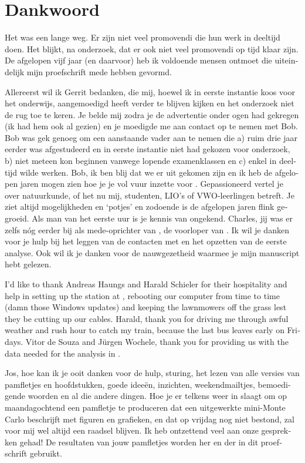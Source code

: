 \chapter{Dankwoord}

\begin{otherlanguage}{dutch}

Het was een lange weg.  Er zijn niet veel promovendi die hun werk in
deeltijd doen.  Het blijkt, na onderzoek, dat er ook niet veel promovendi
op tijd klaar zijn.  De afgelopen vijf jaar (en daarvoor) heb ik voldoende
mensen ontmoet die uiteindelijk mijn proefschrift mede hebben gevormd.

Allereerst wil ik Gerrit bedanken, die mij, hoewel ik in eerste instantie
koos voor het onderwijs, aangemoedigd heeft verder te blijven kijken en
het onderzoek niet de rug toe te keren.  Je belde mij zodra je de
advertentie onder ogen had gekregen (ik had hem ook al gezien) en je
moedigde me aan contact op te nemen met Bob.  Bob was gek genoeg om een
aanstaande vader aan te nemen die a) ruim drie jaar eerder was
afgestudeerd en in eerste instantie niet had gekozen voor onderzoek, b)
niet meteen kon beginnen vanwege lopende examenklassen en c) enkel in
deeltijd wilde werken.  Bob, ik ben blij dat we er uit gekomen zijn en ik
heb de afgelopen jaren mogen zien hoe je je vol vuur inzette voor
\hisparc.  Gepassioneerd vertel je over natuurkunde, of het nu mij,
studenten, LIO's of VWO-leerlingen betreft.  Je ziet altijd mogelijkheden
en `potjes' en zodoende is \hisparc de afgelopen jaren flink gegroeid.
Als man van het eerste uur is je kennis van \hisparc ongekend.  Charles,
jij was er zelfs nóg eerder bij als mede-oprichter van ,
de voorloper van \hisparc.  Ik wil je danken voor je hulp bij het leggen
van de contacten met \kascade en het opzetten van de eerste analyse.  Ook
wil ik je danken voor de nauwgezetheid waarmee je mijn manuscript hebt
gelezen.

I'd like to thank Andreas Haungs and Harald Schieler for their hospitality
and help in setting up the \hisparc station at \kascade, rebooting our
computer from time to time (damn those Windows updates) and keeping the
lawnmowers off the grass lest they be cutting up our cables.  Harald,
thank you for driving me through awful weather and rush hour to catch my
train, because the last bus leaves early on Fridays.  Vitor de Souza and
Jürgen Wochele, thank you for providing us with the data needed for the
analysis in .

Jos, hoe kan ik je ooit danken voor de hulp, sturing, het lezen van alle
versies van pamfletjes en hoofdstukken, goede ideeën, inzichten,
weekendmailtjes, bemoedigende woorden en al die andere dingen.  Hoe je er
telkens weer in slaagt om op maandagochtend een pamfletje te produceren
dat een uitgewerkte mini-Monte Carlo beschrijft met figuren en grafieken,
en dat op vrijdag nog niet bestond, zal voor mij wel altijd een raadsel
blijven.  Ik heb ontzettend veel aan onze gesprekken gehad!  De
resultaten van jouw pamfletjes worden her en der in dit proefschrift
gebruikt.


\end{otherlanguage}
